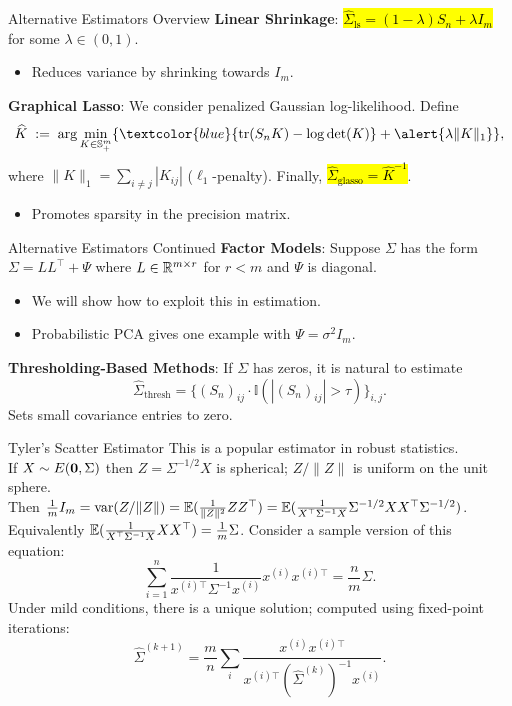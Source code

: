 \documentclass[11pt,handout,aspectratio=169]{beamer}
\begin{document}
\begin{frame}{Alternative Estimators Overview}
  \textbf{Linear Shrinkage}: \hl{$\widehat{\Sigma}_{\text{ls}} = (1 - \lambda) S_n + \lambda I_m$} for some $\lambda\in (0,1)$.
  \begin{itemize}
  	\item Reduces variance by shrinking towards $I_m$.\\[5mm]
  \end{itemize}
  
 
  \textbf{Graphical Lasso}: We consider penalized Gaussian log-likelihood. Define
   \[\widehat{K} \;:=\; \arg\min_{K\in \mathbb S^m_+ }\{\textcolor{blue}{\mathrm{tr}(S_nK)-\log\det(K)}+\alert{\lambda\|K\|_1}\},\]
   where $\|K\|_1=\sum_{i\neq j}|K_{ij}|$ ($\ell_1$-penalty). Finally, 
  \hl{$\widehat \Sigma_{\text{glasso}}=\widehat K^{-1}$}.
  \begin{itemize}
  	\item Promotes sparsity in the precision matrix.
  \end{itemize}
\end{frame}

\begin{frame}{Alternative Estimators Continued}
  \textbf{Factor Models}: Suppose $\Sigma$ has the form
  $\Sigma = LL^\top + \Psi$ 
  where $L\in \mathbb R^{m\times r}$ for $r<m$ and $\Psi$ is diagonal.
  \begin{itemize}
  	\item We will show how to exploit this in estimation.
  	\item Probabilistic PCA gives one example with $\Psi=\sigma^2 I_m$. \\[5mm]
  \end{itemize}
  
  
  \textbf{Thresholding-Based Methods}: If $\Sigma$ has zeros, it is natural to estimate
  \[\widehat{\Sigma}_{\text{thresh}} = \{(S_n)_{ij} \cdot \mathbb{I}(|(S_n)_{ij}|>\tau)\}_{i,j}.\]
  Sets small covariance entries to zero.
\end{frame}

\begin{frame}{Tyler's Scatter Estimator}
This is a popular estimator in robust statistics. \\[4mm]
If $X\sim E(\boldsymbol 0,\Sigma)$ then $Z=\Sigma^{-1/2}X$ is spherical; $Z/\|Z\|$ is uniform on the unit sphere.\\[4mm]
Then $\tfrac1m I_m=\mathrm{var}(Z/\|Z\|)=\mathbb E(\tfrac{1}{\|Z\|^2}ZZ^\top)=\mathbb E(\tfrac{1}{X^\top \Sigma^{-1}X}\Sigma^{-1/2}XX^\top \Sigma^{-1/2})$.\\[4mm]
Equivalently $\mathbb E(\tfrac{1}{X^\top \Sigma^{-1}X}XX^\top)=\tfrac1m \Sigma$. Consider a sample version of this equation:
  \[\sum_{i=1}^n \frac{1}{x^{(i)\top}\Sigma^{-1}x^{(i)}}x^{(i)}x^{(i)\top} = \frac{n}{m}\Sigma.\]
  Under mild conditions, there is a unique solution; computed using fixed-point iterations:
  \[\hat{\Sigma}^{(k+1)} = \frac{m}{n}\sum_{i}\frac{x^{(i)}x^{(i)\top}}{x^{(i)\top}(\hat{\Sigma}^{(k)})^{-1}x^{(i)}}.\]
\end{frame}
\end{document}
